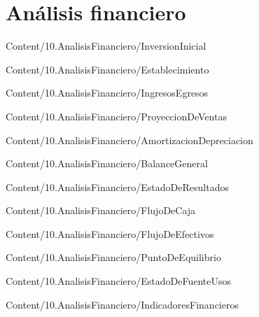 \section{Análisis financiero}

{Content/10.AnalisisFinanciero/InversionInicial}

{Content/10.AnalisisFinanciero/Establecimiento}

{Content/10.AnalisisFinanciero/IngresosEgresos}

{Content/10.AnalisisFinanciero/ProyeccionDeVentas}

{Content/10.AnalisisFinanciero/AmortizacionDepreciacion}

{Content/10.AnalisisFinanciero/BalanceGeneral}

{Content/10.AnalisisFinanciero/EstadoDeResultados}

{Content/10.AnalisisFinanciero/FlujoDeCaja}

{Content/10.AnalisisFinanciero/FlujoDeEfectivos}



{Content/10.AnalisisFinanciero/PuntoDeEquilibrio}

{Content/10.AnalisisFinanciero/EstadoDeFuenteUsos}


{Content/10.AnalisisFinanciero/IndicadoresFinancieros}